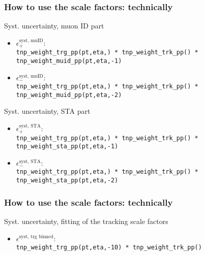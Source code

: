 \documentclass[10pt]{beamer}
\begin{document}
 
  \begin{frame}
  \frametitle{How to use the scale factors: technically}
  
    \begin{block}{Syst. uncertainty, muon ID part}
  \begin{itemize}
   \item \alert{$\epsilon^\text{syst, muID}_{+}$}: \\\texttt{tnp\_weight\_trg\_pp(pt,eta,) * tnp\_weight\_trk\_pp() * tnp\_weight\_\alert{muid}\_pp(pt,eta,\alert{-1})}
   
   \item \alert{$\epsilon^\text{syst, muID}_{-}$}: \\\texttt{tnp\_weight\_trg\_pp(pt,eta,) * tnp\_weight\_trk\_pp() * tnp\_weight\_\alert{muid}\_pp(pt,eta,\alert{-2})}
   \end{itemize}
  \end{block}
  
  \begin{block}{Syst. uncertainty, STA part}
  \begin{itemize}
   \item \alert{$\epsilon^\text{syst, STA}_{+}$}: \\\texttt{tnp\_weight\_trg\_pp(pt,eta,) * tnp\_weight\_trk\_pp() * tnp\_weight\_\alert{sta}\_pp(pt,eta,\alert{-1})}
   
   \item \alert{$\epsilon^\text{syst, STA}_{-}$}: \\\texttt{tnp\_weight\_trg\_pp(pt,eta,) * tnp\_weight\_trk\_pp() * tnp\_weight\_\alert{sta}\_pp(pt,eta,\alert{-2})}
   \end{itemize}
  \end{block}

 \end{frame}
 
  \begin{frame}
  \frametitle{How to use the scale factors: technically}
  
  \begin{block}{Syst. uncertainty, fitting of the tracking scale factors}
  \begin{itemize}
   \item \alert{$\epsilon^\text{syst, trg binned}$}: \\\texttt{tnp\_weight\_trg\_pp(pt,eta,\alert{-10}) * tnp\_weight\_trk\_pp()}
   \end{itemize}
  \end{block}
 \end{frame}
 
\end{document}
